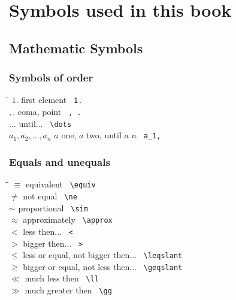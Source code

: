 \newcommand{\mySymbols}{\hspace*{0.2\textwidth}\=\hspace*{0.6\textwidth}\=\hspace*{0.2\textwidth}\kill}

\section{Symbols used in this book}
\subsection{Mathematic Symbols}
\subsubsection{Symbols of order}


\begin{tabbing}
\mySymbols
$ {1.}$               \> first element                   \> \verb` 1. `    \\
$ {, .}$              \> coma, point                     \> \verb` , . `   \\
$ {\dots}$            \> until...                        \> \verb` \dots ` \\
$ a_1,a_2,\dots ,a_n$ \> $a$ one, $a$ two, until $a$ $n$ \> \verb` a_1, `  \\
\end{tabbing}

\subsubsection{Equals and unequals}
\begin{tabbing}
\mySymbols
$ {\equiv}$           \> equivalent                        \> \verb` \equiv ` \\
$ {\ne}$              \> not equal                         \> \verb` \ne ` \\ 
$ {\sim}$             \> proportional                      \> \verb` \sim ` \\
$ {\approx}$          \> approximately                     \> \verb` \approx ` \\
$ {<}$                \> less then...                      \> \verb` < ` \\
$ {>}$                \> bigger then...                    \> \verb` > ` \\ 
$ {\leqslant}$        \> less or equal, not bigger then... \> \verb` \leqslant ` \\
$ {\geqslant}$        \> bigger or equal, not less then... \> \verb` \geqslant ` \\
$ {\ll}$              \> much less then                    \> \verb` \ll ` \\
$ {\gg}$              \> much greater then                 \> \verb` \gg ` \\
\end{tabbing}

